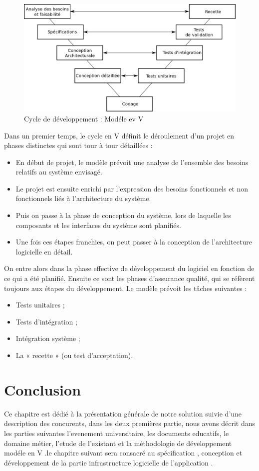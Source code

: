 \documentclass[12pt]{report}
\begin{document}
\begin{figure}[h]
    \centering
    \includegraphics[width=1\textwidth]{cyclev}
    \caption{Cycle de développement : Modéle ev V}
    \label{fig:mesh5}
\end{figure}

Dans un premier temps, le cycle en V définit le déroulement d’un projet en phases distinctes qui sont tour à tour détaillées :
\begin{itemize}
\item En début de projet, le modèle prévoit une analyse de l’ensemble des besoins relatifs au système envisagé.
\item Le projet est ensuite enrichi par l’expression des besoins fonctionnels et non fonctionnels liés à l’architecture du système.
\item Puis on passe à la phase de conception du système, lors de laquelle les composants et les interfaces du système sont planifiés.
\item Une fois ces étapes franchies, on peut passer à la conception de l’architecture logicielle en détail.
\end{itemize}

On entre alors dans la phase effective de développement du logiciel en fonction de ce qui a été planifié. Ensuite ce sont les phases d’assurance qualité, qui se réfèrent toujours aux étapes du développement. Le modèle prévoit les tâches suivantes :
\begin{itemize}
\item Tests unitaires ;
\item Tests d’intégration ;
\item Intégration système ;
\item La « recette » (ou test d’acceptation).
\end{itemize}




\section*{Conclusion}
Ce chapitre est dédié à la présentation générale de notre solution suivie d’une description des
concurents, dans les deux premières partie, nous avons décrit dans les parties suivantes
l'evenement universitaire, les documents educatifs, le domaine métier, l'etude de l'existant et la méthodologie de développement modéle en V .le chapitre suivant sera consacré au spécification , conception et développement de la partie infrastructure logicielle de l'application .
\end{document}
